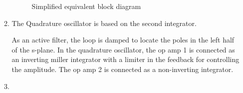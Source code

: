 \begin{enumerate}[label=\arabic*.,ref=\theenumi]
\begin{enumerate}[label=\arabic*.,ref=\theenumi]
\renewcommand{\thefigure}{\theenumi.\arabic{figure}}
\begin{figure}[!ht]
	\begin{center}
		\resizebox{\columnwidth}{!}{}
	\end{center}
\caption{Simplified equivalent block diagram}
\label{fig:es17btech11009_block}
\end{figure}
\item 
 The Quadrature oscillator is based on the second integrator.

As an active filter, the loop is damped to locate the poles in the left half of the s-plane. In the quadrature oscillator, the op amp 1 is connected as an inverting miller integrator with a limiter in the feedback for controlling the amplitude. The op amp 2 is connected as a non-inverting integrator.

\item


\end{enumerate}
\end{enumerate}
